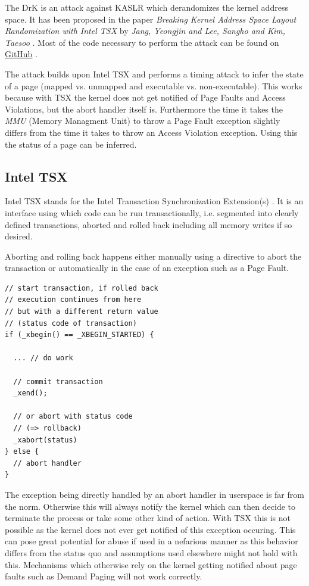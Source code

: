 The DrK is an attack against KASLR which derandomizes the kernel address space.
It has been proposed in the paper \textit{Breaking Kernel Address Space Layout Randomization with Intel TSX} by \textit{Jang, Yeongjin and Lee, Sangho and Kim, Taesoo} \cite{drk}.
Most of the code necessary to perform the attack can be found on \href{https://github.com/sslab-gatech/DrK}{GitHub} \cite{drk-attack-proof-of-concept-github}.

The attack builds upon Intel TSX and performs a timing attack to infer the state of a page (mapped vs. unmapped and executable vs. non-executable).
This works because with TSX the kernel does not get notified of Page Faults and Access Violations, but the abort handler itself is.
Furthermore the time it takes the \textit{MMU} (Memory Managment Unit) to throw a Page Fault exception slightly differs from the time it takes to throw an Access Violation exception.
Using this the status of a page can be inferred.

\subsection{Intel TSX}

Intel TSX stands for the Intel Transaction Synchronization Extension(s) \cite{intel-tsx-overview}.
It is an interface using which code can be run transactionally, i.e. segmented into clearly defined transactions, aborted and rolled back including all memory writes if so desired.

Aborting and rolling back happens either manually using a directive to abort the transaction or automatically in the case of an exception such as a Page Fault.

\begin{lstlisting}
// start transaction, if rolled back
// execution continues from here
// but with a different return value
// (status code of transaction)
if (_xbegin() == _XBEGIN_STARTED) {

  ... // do work

  // commit transaction
  _xend();

  // or abort with status code
  // (=> rollback)
  _xabort(status)
} else {
  // abort handler
}
\end{lstlisting}

The exception being directly handled by an abort handler in userspace is far from the norm. Otherwise this will always notify the kernel which can then decide to terminate the process or take some other kind of action.
With TSX this is not possible as the kernel does not ever get notified of this exception occuring.
This can pose great potential for abuse if used in a nefarious manner as this behavior differs from the status quo and assumptions used elsewhere might not hold with this.
Mechanisms which otherwise rely on the kernel getting notified about page faults such as Demand Paging will not work correctly.

